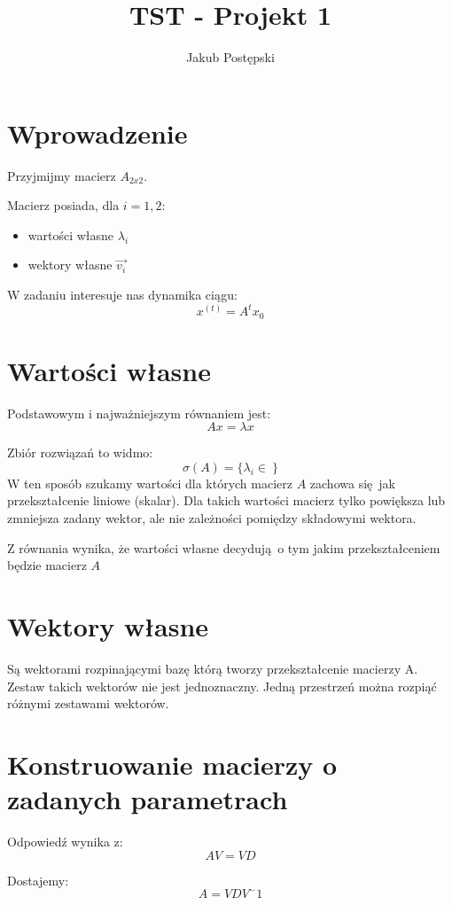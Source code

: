 \documentclass[]{article}
\title{TST - Projekt 1}
\author{Jakub Postępski}
\begin{document}
\maketitle


\section{Wprowadzenie}
Przyjmijmy macierz $A_{2x2}$.

Macierz posiada, dla $i = {1, 2}$:
\begin{itemize}
	\item wartości własne $\lambda_i$
	\item wektory własne $\vec{v_i}$ 
\end{itemize}

W zadaniu interesuje nas dynamika ciągu:
\[x^{(t)} = A^tx_0 \]

\section{Wartości własne}

Podstawowym i najważniejszym równaniem jest:
\[ Ax = \lambda x\]

Zbiór rozwiązań to widmo: \[\sigma(A) = \{ \lambda_i \in \  \} \]
W ten sposób szukamy wartości dla których macierz $A$ zachowa się jak przekształcenie liniowe (skalar). Dla takich wartości macierz tylko powiększa lub zmniejsza zadany wektor, ale nie zależności pomiędzy składowymi wektora. 

Z równania wynika, że wartości własne decydują o tym jakim przekształceniem będzie macierz $A$

\section{Wektory własne}
Są wektorami rozpinającymi bazę którą tworzy przekształcenie macierzy A. Zestaw takich wektorów nie jest jednoznaczny. Jedną przestrzeń można rozpiąć różnymi zestawami wektorów. 

\section{Konstruowanie macierzy o zadanych parametrach}
Odpowiedź wynika z:
\[ AV = VD \]

Dostajemy:
\[A = VDV^-1\]
\end{document}
